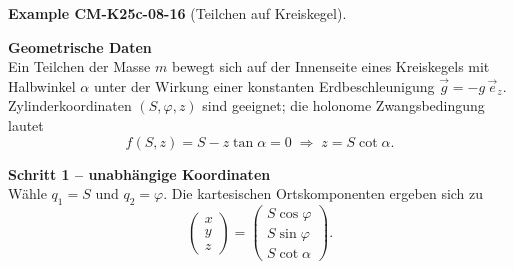 \documentclass[10pt, letterpaper]{article}
\newcommand{\CustomHeading}[3]{%
  \par\medskip\noindent%
  \textbf{#1 #2} \textnormal{(#3)}.\enskip%
}
\newenvironment{EXA}[2]{\begin{unitbox}\CustomHeading{Example}{#1}{#2}}{\end{unitbox}}
\begin{document}
\begin{EXA}{CM-K25c-08-16}{Teilchen auf Kreiskegel}
\begin{center}
\end{center}

\textbf{Geometrische Daten}\\
Ein Teilchen der Masse $m$ bewegt sich auf der Innenseite eines
Kreiskegels mit Halbwinkel $\alpha$ unter der Wirkung einer konstanten
Erdbeschleunigung $\vec g = -g\,\vec e_z$.  
Zylinderkoordinaten $(S,\varphi,z)$ sind geeignet; die
holonome Zwangsbedingung lautet
\[
  f(S,z)=S-z\tan\alpha=0
  \;\Longrightarrow\;
  z = S\cot\alpha .
\]

\textbf{Schritt 1 – unabhängige Koordinaten}\\
Wähle $q_1=S$ und $q_2=\varphi$.
Die kartesischen Orts­komponenten ergeben sich zu
\[
  \begin{pmatrix} x \\ y \\ z \end{pmatrix} =
  \begin{pmatrix}
    S\cos\varphi \\[2pt]
    S\sin\varphi \\[2pt]
    S\cot\alpha
  \end{pmatrix}.
\]


\end{EXA}
\end{document}
